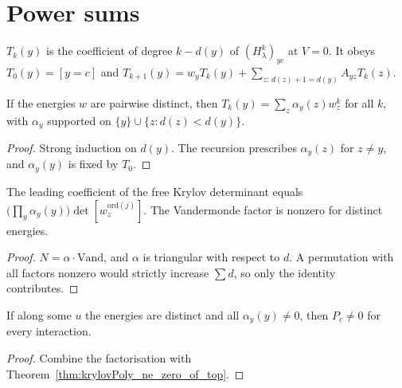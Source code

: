 \section{Power sums}

\begin{definition}
  \label{def:T}
  \leanok
  $T_k(y)$ is the coefficient of degree $k-d(y)$ of $(H_\lambda^k)_{yc}$ at $V=0$. It obeys
  $T_0(y)=[y=c]$ and $T_{k+1}(y)=w_yT_k(y)+\sum_{z:\,d(z)+1=d(y)}A_{yz}T_k(z)$.
\end{definition}

\begin{theorem}
  \label{thm:power_sum}
  \leanok
  If the energies $w$ are pairwise distinct, then $T_k(y)=\sum_z\alpha_y(z)w_z^k$ for all $k$, with
  $\alpha_y$ supported on $\{y\}\cup\{z: d(z)<d(y)\}$.
\end{theorem}
\begin{proof}
  \leanok
  Strong induction on $d(y)$. The recursion prescribes $\alpha_y(z)$ for $z\ne y$, and $\alpha_y(y)$ is
  fixed by $T_0$.
\end{proof}

\begin{theorem}[Factorisation]
  \label{thm:top_coeff_factor}
  \leanok
  The leading coefficient of the free Krylov determinant equals $\big(\prod_y\alpha_y(y)\big)\det[w_z^{\mathrm{ord}(j)}]$.
  The Vandermonde factor is nonzero for distinct energies.
\end{theorem}
\begin{proof}
  \leanok
  $N=\alpha\cdot\mathrm{Vand}$, and $\alpha$ is triangular with respect to $d$. A permutation with all
  factors nonzero would strictly increase $\sum d$, so only the identity contributes.
\end{proof}

\begin{theorem}
  \label{thm:hstar_of_alpha}
  \leanok
  If along some $u$ the energies are distinct and all $\alpha_y(y)\ne0$, then $P_c\neq0$ for every interaction.
\end{theorem}
\begin{proof}
  \leanok
  Combine the factorisation with Theorem~\ref{thm:krylovPoly_ne_zero_of_top}.
\end{proof}

